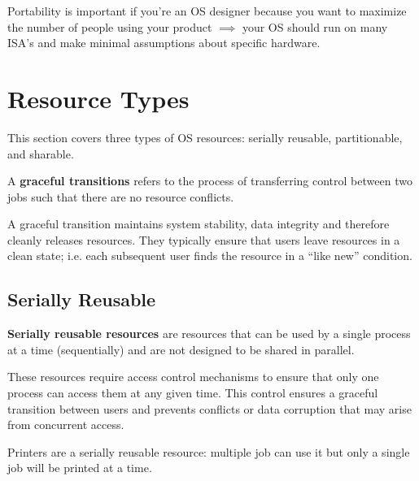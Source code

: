 \documentclass{report}
\begin{document}
Portability is important if you're an OS designer because you want to maximize the number of people
using your product $\implies$ your OS should run on many ISA's and make minimal assumptions about
specific hardware.










\chapter{Resource Types}
This section covers three types of OS resources: serially reusable, partitionable, and
sharable.

\begin{tcolorbox}[title=Definition: Graceful Transition]
  A \textbf{graceful transitions} refers to the process of transferring control between two jobs
  such that there are no resource conflicts. 
\end{tcolorbox}

A graceful transition maintains system stability, data integrity and therefore cleanly releases
resources. They typically ensure that users leave resources in a clean state; i.e. each
subsequent user finds the resource in a ``like new'' condition.





\section{Serially Reusable}
\begin{tcolorbox}[title=Definition: Serially Reusable Resource]
  \textbf{Serially reusable resources} are resources that can be used by a single process at a time
  (sequentially) and are not designed to be shared in parallel.
\end{tcolorbox}

These resources require access control mechanisms to ensure that only one process can access them at
any given time. This control ensures a graceful transition between users and prevents conflicts or
data corruption that may arise from concurrent access.

\begin{tcolorbox}[colback=blue!5!white,colframe=black!75!blue,title=Example: Printing Process]
  Printers are a serially reusable resource: multiple job can use it but only a single job will be
  printed at a time. 
\end{tcolorbox}
\end{document}
